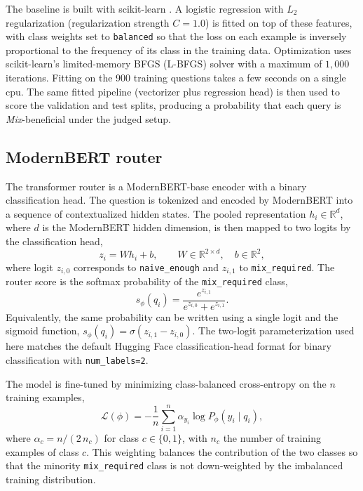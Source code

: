 \documentclass[english, bibtex]{kththesis}               %
\numberwithin{listing}{chapter}
\begin{document}
The baseline is built with scikit-learn \cite{pedregosa2011scikit}. A logistic regression with $L_2$ regularization (regularization strength $C=1.0$) is fitted on top of these features, with class weights set to \texttt{balanced} so that the loss on each example is inversely proportional to the frequency of its class in the training data. Optimization uses scikit-learn's limited-memory BFGS (L-BFGS) solver \cite{liu1989limited} with a maximum of $1{,}000$ iterations. Fitting on the 900 training questions takes a few seconds on a single \gls{cpu}. The same fitted pipeline (vectorizer plus regression head) is then used to score the validation and test splits, producing a probability that each query is \emph{Mix}-beneficial under the judged setup.

\subsection{ModernBERT router}
\label{sec:methodModernBert}

The transformer router is a ModernBERT-base \cite{warner2024modernbert} encoder with a binary classification head. The question is tokenized and encoded by ModernBERT into a sequence of contextualized hidden states. The pooled representation \(h_i \in \mathbb{R}^{d}\), where \(d\) is the ModernBERT hidden dimension, is then mapped to two logits by the classification head,
\begin{equation}
\label{eq:modernBertLogits}
z_i = W h_i + b,
\qquad
W \in \mathbb{R}^{2 \times d}, \quad b \in \mathbb{R}^{2},
\end{equation}
where logit \(z_{i,0}\) corresponds to \texttt{naive\_enough} and \(z_{i,1}\) to \texttt{mix\_required}. The router score is the softmax probability of the \texttt{mix\_required} class,
\begin{equation}
\label{eq:modernBertSoftmax}
s_\phi(q_i)
=
\frac{e^{z_{i,1}}}{e^{z_{i,0}} + e^{z_{i,1}}}.
\end{equation}
Equivalently, the same probability can be written using a single logit and the sigmoid function, $s_\phi(q_i) = \sigma(z_{i,1} - z_{i,0})$. The two-logit parameterization used here matches the default Hugging Face classification-head format for binary classification with \texttt{num\_labels=2}.

The model is fine-tuned by minimizing class-balanced cross-entropy on the \(n\) training examples,
\begin{equation}
\label{eq:modernBertLoss}
\mathcal{L}(\phi)
=
-\frac{1}{n}\sum_{i=1}^{n}
\alpha_{y_i} \log P_\phi(y_i \mid q_i),
\end{equation}
where \(\alpha_{c} = n / (2\,n_c)\) for class \(c \in \{0, 1\}\), with \(n_c\) the number of training examples of class \(c\). This weighting balances the contribution of the two classes so that the minority \texttt{mix\_required} class is not down-weighted by the imbalanced training distribution.
\end{document}
